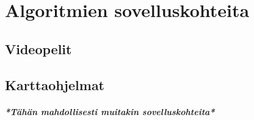 \chapter{Algoritmien sovelluskohteita} \label{algoritmienSovelluskohteita}
\section{Videopelit}\label{videopelit}
\section{Karttaohjelmat}\label{karttaohjelmat}

\paragraph{\textit{*Tähän mahdollisesti muitakin sovelluskohteita*}}
